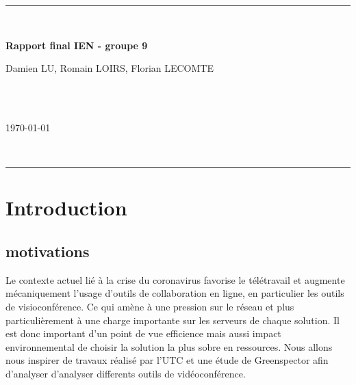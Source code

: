 \documentclass[11pt,a4paper]{report}
\begin{document}
\begin{titlepage}
\vspace*{\fill}
\hrule ~\vspace{0.5cm}

\begin{huge}
\noindent \textbf{Rapport final IEN - groupe 9}
\end{huge} 
\vspace{0.5cm}

\vspace{2cm}

\begin{Large}
\noindent Damien LU, Romain LOIRS, Florian LECOMTE
\end{Large} \\ \\
\begin{Large}
\today
\end{Large}
~\vspace{0.5cm}
\hrule
\vspace*{\fill}
\end{titlepage}

\tableofcontents

\newpage
\chapter*{Introduction}

\section{motivations}
Le contexte actuel lié à la crise du coronavirus favorise le télétravail et augmente mécaniquement l’usage d’outils de collaboration en ligne, en particulier les outils de visioconférence. Ce qui amène à une pression sur le réseau et plus particulièrement à une charge importante sur les serveurs de chaque solution. Il est donc important d’un point de vue efficience mais aussi impact environnemental de choisir la solution la plus sobre en ressources. Nous allons nous inspirer de travaux réalisé par l'UTC et une étude de Greenspector afin d'analyser d'analyser differents outils de vidéoconférence.
\end{document}
